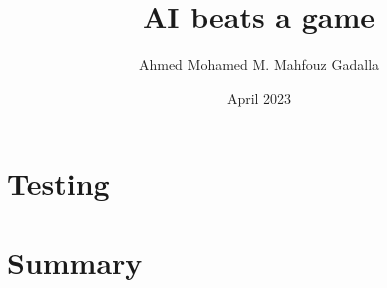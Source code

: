 \documentclass{thesis-ekf}
\begin{document}
	
	\author{Ahmed Mohamed M. Mahfouz Gadalla}
	\title{AI beats a game}
	\date{April 2023}
	
	
	\maketitle
	\tableofcontents
	
%	
%	
%


	
	

	
	
%	
	
	
	
	\chapter{Testing}
	
	
	\chapter{Summary}
	
	
	
\end{document}
